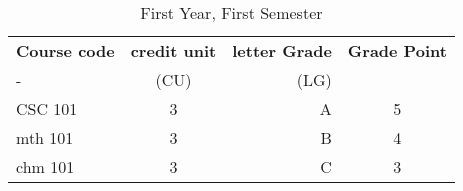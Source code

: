 \documentclass{article}
\begin{document}
	\begin{table}[h!]
		\begin{center}
			\caption{First Year, First Semester}
			\label{tab:table1}
			\begin{tabular}{l|c|r|c}
				\textbf{Course code} & \textbf{credit unit} & \textbf{letter Grade} & \textbf{Grade Point}\\ - & (CU) & (LG)\\
				CSC 101 & 3 & A & 5\\
				mth 101 & 3 & B & 4\\
				chm 101 & 3 & C & 3\\
			\end{tabular}
		\end{center}
	\end{table}
\end{document}

